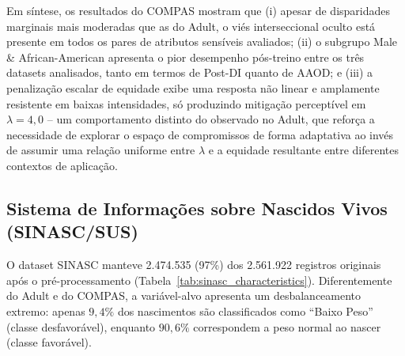 Em síntese, os resultados do COMPAS mostram que (i) apesar de disparidades marginais mais moderadas que as do Adult, o viés interseccional oculto está presente em todos os pares de atributos sensíveis avaliados; (ii) o subgrupo Male \& African-American apresenta o pior desempenho pós-treino entre os três datasets analisados, tanto em termos de Post-DI quanto de AAOD; e (iii) a penalização escalar de equidade exibe uma resposta não linear e amplamente resistente em baixas intensidades, só produzindo mitigação perceptível em $\lambda = 4,0$ -- um comportamento distinto do observado no Adult, que reforça a necessidade de explorar o espaço de compromissos de forma adaptativa ao invés de assumir uma relação uniforme entre $\lambda$ e a equidade resultante entre diferentes contextos de aplicação.

\subsection{Sistema de Informações sobre Nascidos Vivos (SINASC/SUS)}

O dataset SINASC manteve 2.474.535 (97\%) dos 2.561.922 registros originais após o pré-processamento (Tabela~\ref{tab:sinasc_characteristics}). Diferentemente do Adult e do COMPAS, a variável-alvo apresenta um desbalanceamento extremo: apenas $9,4\%$ dos nascimentos são classificados como ``Baixo Peso'' (classe desfavorável), enquanto $90,6\%$ correspondem a peso normal ao nascer (classe favorável).

\begin{table}[H]
    \centering
    \caption{Métricas dinâmicas de viés (Fairness) avaliadas por atributo sensível/proxy para o dataset SINASC.}
    \vspace{2mm}
    \label{tab:sinasc_dynamic_bias_metrics}
\end{table}

